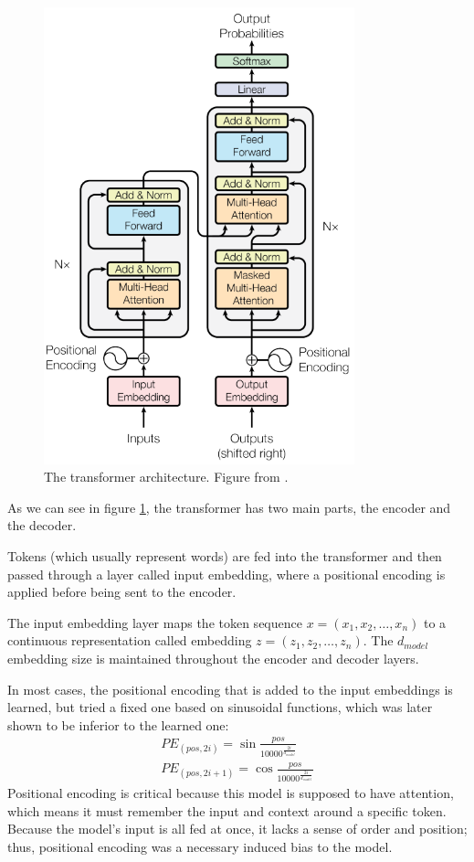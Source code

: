 \documentclass{report}[12pt, a4paper]
\begin{document}
\begin{figure}[htp]
    \centering
    \includegraphics[width=9cm]{transformer}
    \caption{The transformer architecture. Figure from \cite{attention_is_all_you_need}.}
    \label{fig:transformer}
\end{figure}

As we can see in figure \ref{fig:transformer}, the transformer has two main parts, the encoder and the decoder.

Tokens (which usually represent words) are fed into the transformer and then passed through a layer called input embedding, where a positional encoding is applied before being sent to the encoder.

The input embedding layer maps the token sequence $x=(x_{1}, x_{2}, \dots, x_{n})$ to a continuous representation called embedding $z=(z_{1}, z_{2}, \dots, z_{n})$. The $d_{model}$ embedding size is maintained throughout the encoder and decoder layers.

In most cases, the positional encoding that is added to the input embeddings is learned, but \citeauthor{attention_is_all_you_need} tried a fixed one based on sinusoidal functions, which was later shown to be inferior to the learned one:
\begin{align*}
    PE_{(pos, 2i)} = \sin{\frac{pos}{10000^{\frac{2i}{d_{model}}}}}\\
    PE_{(pos, 2i+1)} = \cos{\frac{pos}{10000^{\frac{2i}{d_{model}}}}}
\end{align*}
Positional encoding is critical because this model is supposed to have attention, which means it must remember the input and context around a specific token. Because the model's input is all fed at once, it lacks a sense of order and position; thus, positional encoding was a necessary induced bias to the model.
\end{document}
